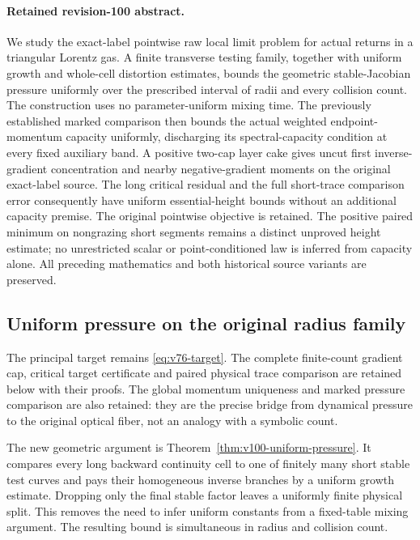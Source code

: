 \documentclass[11pt,reqno]{amsart}
\numberwithin{equation}{section}
\theoremstyle{definition}\newtheorem{definition}[theorem]{Definition}
\theoremstyle{remark}\newtheorem{remark}[theorem]{Remark}
\theoremstyle{definition}\newtheorem{inputstatement}[theorem]{Input statement}
\begin{document}
\paragraph{Retained revision-100 abstract.}

We study the exact-label pointwise raw local limit problem for actual
returns in a triangular Lorentz gas. A finite transverse testing family,
together with uniform growth and whole-cell distortion estimates,
bounds the geometric stable-Jacobian pressure uniformly over the
prescribed interval of radii and every collision count. The construction
uses no parameter-uniform mixing time. The previously established
marked comparison then bounds the actual weighted endpoint-momentum
capacity uniformly, discharging its spectral-capacity condition at
every fixed auxiliary band. A positive two-cap layer cake gives uncut
first inverse-gradient concentration and nearby negative-gradient
moments on the original exact-label source. The long critical residual
and the full short-trace comparison error consequently have uniform
essential-height bounds without an additional capacity premise.
The original pointwise objective is retained. The positive paired
minimum on nongrazing short segments remains a distinct unproved
height estimate; no unrestricted scalar or point-conditioned law is
inferred from capacity alone. All preceding mathematics and both
historical source variants are preserved.




\subsection{Uniform pressure on the original radius family}
The principal target remains \eqref{eq:v76-target}. The complete
finite-count gradient cap, critical target certificate and paired
physical trace comparison are retained below with their proofs.
The global momentum uniqueness and marked pressure comparison are
also retained: they are the precise bridge from dynamical pressure
to the original optical fiber, not an analogy with a symbolic count.

The new geometric argument is Theorem~\ref{thm:v100-uniform-pressure}.
It compares every long backward continuity cell to one of finitely
many short stable test curves and pays their homogeneous inverse
branches by a uniform growth estimate. Dropping only the final stable
factor leaves a uniformly finite physical split. This removes the
need to infer uniform constants from a fixed-table mixing argument.
The resulting bound is simultaneous in radius and collision count.
\end{document}

